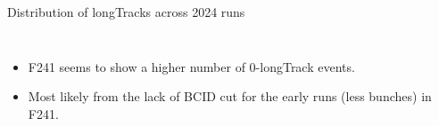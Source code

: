 \begin{frame}{Distribution of longTracks across 2024 runs}
\begin{columns}
\begin{column}{0.55 \linewidth}
\begin{figure}
			\end{figure}
		\end{column}
	\end{columns}
	\begin{itemize}
		\item F241 seems to show a higher number of 0-longTrack events.
		\item Most likely from the lack of BCID cut for the early runs (less bunches) in F241.
	\end{itemize}
\end{frame}


